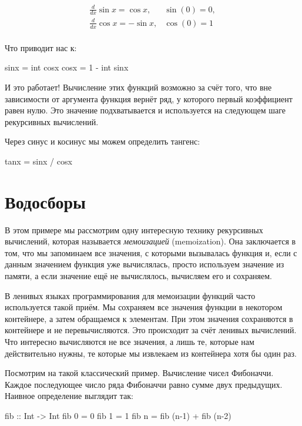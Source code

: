 \[\begin{array}{ll}
\frac{d}{dx} \sin{x} = \cos{x},   & \sin(0) = 0, \\
\frac{d}{dx} \cos{x} = - \sin{x},  & \cos(0) = 1 \\
\end{array}\]

Что приводит нас к:


\begin{code}
sinx = int cosx
cosx = 1 - int sinx
\end{code}

И это работает! Вычисление этих функций возможно за счёт того, что вне
зависимости от аргумента функция  вернёт ряд, у которого первый
коэффициент равен нулю. Это значение подхватывается и используется на
следующем шаге рекурсивных вычислений.

Через синус и косинус мы можем определить тангенс:


\begin{code}
tanx = sinx / cosx
\end{code}

\section{Водосборы}

В этом примере мы рассмотрим одну интересную технику рекурсивных
вычислений, которая называется \emph{мемоизацией} (memoization). Она
заключается в том, что мы запоминаем все значения, с которыми вызывалась
функция и, если с данным значением функция уже вычислялась, просто
используем значение из памяти, а если значение ещё не вычислялось,
вычисляем его и сохраняем.

В ленивых языках программирования для мемоизации функций часто
используется такой приём. Мы сохраняем все значения функции в некотором
контейнере, а затем обращаемся к элементам. При этом значения
сохраняются в контейнере и не перевычисляются. Это происходит за счёт
ленивых вычислений. Что интересно вычисляются не все значения, а лишь
те, которые нам действительно нужны, те которые мы извлекаем из
контейнера хотя бы один раз.

Посмотрим на такой классический пример. Вычисление чисел Фибоначчи.
Каждое последующее число ряда Фибоначчи равно сумме двух предыдущих.
Наивное определение выглядит так:


\begin{code}
fib :: Int -> Int
fib 0 = 0
fib 1 = 1
fib n = fib (n-1) + fib (n-2)
\end{code}

